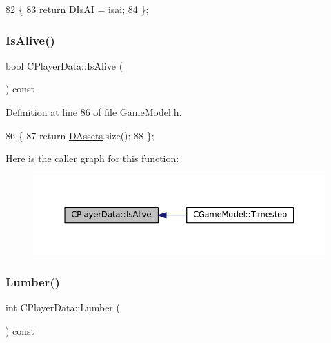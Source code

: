 \begin{DoxyCode}
82                             \{
83             \textcolor{keywordflow}{return} \hyperlink{classCPlayerData_ad3fcb8740d4e37b4654c01c8c595e6d5}{DIsAI} = isai;
84         \};
\end{DoxyCode}
\hypertarget{classCPlayerData_a46ba3f00069e6da5cf4a1203a7456e1d}{}\label{classCPlayerData_a46ba3f00069e6da5cf4a1203a7456e1d} 
\subsubsection{\texorpdfstring{Is\+Alive()}{IsAlive()}}
{\footnotesize\ttfamily bool C\+Player\+Data\+::\+Is\+Alive (\begin{DoxyParamCaption}{ }\end{DoxyParamCaption}) const\hspace{0.3cm}{\ttfamily [inline]}}



Definition at line 86 of file Game\+Model.\+h.


\begin{DoxyCode}
86                             \{
87             \textcolor{keywordflow}{return} \hyperlink{classCPlayerData_a1d7dd355facf52db6242e3554373906c}{DAssets}.size();
88         \};
\end{DoxyCode}
Here is the caller graph for this function\+:\nopagebreak
\begin{figure}[H]
\begin{center}
\leavevmode
\includegraphics[width=350pt]{classCPlayerData_a46ba3f00069e6da5cf4a1203a7456e1d_icgraph}
\end{center}
\end{figure}
\hypertarget{classCPlayerData_a73b2e6868bd85953604412904a20316a}{}\label{classCPlayerData_a73b2e6868bd85953604412904a20316a} 
\subsubsection{\texorpdfstring{Lumber()}{Lumber()}}
{\footnotesize\ttfamily int C\+Player\+Data\+::\+Lumber (\begin{DoxyParamCaption}{ }\end{DoxyParamCaption}) const\hspace{0.3cm}{\ttfamily [inline]}}



